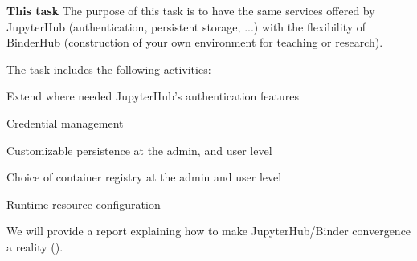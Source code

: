 \begin{task}[
  title=JupyterHub / BinderHub convergence,
  id=jh-bh-conv,
  lead=EP,
  PM=16, %
  wphases={0-36!.5},
  partners={WTT}]
  \textbf{This task}
  The purpose of this task is to have the same services offered by JupyterHub
  (authentication, persistent storage, ...) with the flexibility of BinderHub
  (construction of your own environment for teaching or research).

  The task includes the following activities:
  \begin{compactitem}
  \item Extend where needed JupyterHub's authentication features%
  \item Credential management
  \item Customizable persistence at the admin, and user level
  \item Choice of container registry at the admin and user level %
  \item Runtime resource configuration %
  \end{compactitem}
  We will provide a report explaining how to make JupyterHub/Binder convergence a reality ().
\end{task}

